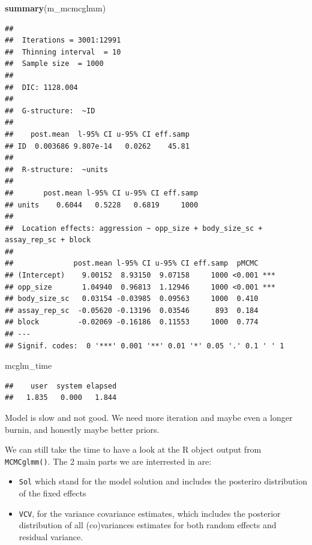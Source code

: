 \documentclass[
  12pt,
]{book}
\newenvironment{Shaded}{\begin{snugshade}}{\end{snugshade}}
\newcommand{\KeywordTok}[1]{\textcolor[rgb]{0.13,0.29,0.53}{\textbf{#1}}}
\newcommand{\NormalTok}[1]{#1}
\providecommand{\tightlist}{%
  \setlength{\itemsep}{0pt}\setlength{\parskip}{0pt}}
\begin{document}
\begin{Shaded}
\begin{Highlighting}[]
\KeywordTok{summary}\NormalTok{(m\_mcmcglmm)}
\end{Highlighting}
\end{Shaded}

\begin{verbatim}
## 
##  Iterations = 3001:12991
##  Thinning interval  = 10
##  Sample size  = 1000 
## 
##  DIC: 1128.004 
## 
##  G-structure:  ~ID
## 
##    post.mean  l-95% CI u-95% CI eff.samp
## ID  0.003686 9.807e-14   0.0262    45.81
## 
##  R-structure:  ~units
## 
##       post.mean l-95% CI u-95% CI eff.samp
## units    0.6044   0.5228   0.6819     1000
## 
##  Location effects: aggression ~ opp_size + body_size_sc + assay_rep_sc + block 
## 
##              post.mean l-95% CI u-95% CI eff.samp  pMCMC    
## (Intercept)    9.00152  8.93150  9.07158     1000 <0.001 ***
## opp_size       1.04940  0.96813  1.12946     1000 <0.001 ***
## body_size_sc   0.03154 -0.03985  0.09563     1000  0.410    
## assay_rep_sc  -0.05620 -0.13196  0.03546      893  0.184    
## block         -0.02069 -0.16186  0.11553     1000  0.774    
## ---
## Signif. codes:  0 '***' 0.001 '**' 0.01 '*' 0.05 '.' 0.1 ' ' 1
\end{verbatim}

\begin{Shaded}
\begin{Highlighting}[]
\NormalTok{mcglm\_time}
\end{Highlighting}
\end{Shaded}

\begin{verbatim}
##    user  system elapsed 
##   1.835   0.000   1.844
\end{verbatim}

Model is slow and not good. We need more iteration and maybe even a longer burnin, and honestly maybe better priors.

We can still take the time to have a look at the R object output from \texttt{MCMCglmm()}. The 2 main parts we are interrested in are:

\begin{itemize}
\tightlist
\item
  \texttt{Sol} which stand for the model solution and includes the posteriro distribution of the fixed effects
\item
  \texttt{VCV}, for the variance covariance estimates, which includes the posterior distribution of all (co)variances estimates for both random effects and residual variance.
\end{itemize}
\end{document}
